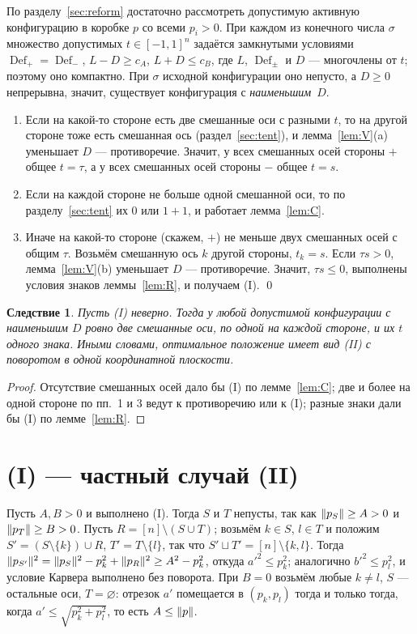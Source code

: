 \documentclass[11pt]{article}
\newtheorem{corollary}[theorem]{Следствие}
\theoremstyle{definition}
\theoremstyle{remark}
\newcommand{\Def}{\operatorname{Def}}
\DeclarePairedDelimiter{\norm}{\lVert}{\rVert}
\begin{document}
По разделу~\ref{sec:reform} достаточно рассмотреть допустимую активную конфигурацию в коробке $p$ со всеми
$p_i>0$. При каждом из конечного числа $\sigma$ множество допустимых $t\in[-1,1]^n$ задаётся замкнутыми условиями
$\Def_+=\Def_-$, $L-D\ge c_A$, $L+D\le c_B$, где $L$, $\Def_\pm$ и $D$ --- многочлены от $t$; поэтому оно
компактно. При $\sigma$ исходной конфигурации оно непусто, а $D\ge0$ непрерывна, значит, существует конфигурация с \emph{наименьшим}~$D$.
\begin{enumerate}
\item Если на какой-то стороне есть две смешанные оси с разными $t$, то на другой стороне тоже есть смешанная
ось (раздел~\ref{sec:tent}), и лемма~\ref{lem:V}(a) уменьшает $D$ --- противоречие. Значит, у всех смешанных осей
стороны $+$ общее $t=\tau$, а у всех смешанных осей стороны $-$ общее $t=s$.
\item Если на каждой стороне не больше одной смешанной оси, то по разделу~\ref{sec:tent} их $0$ или $1+1$, и
работает лемма~\ref{lem:C}.
\item Иначе на какой-то стороне (скажем, $+$) не меньше двух смешанных осей с общим $\tau$. Возьмём смешанную ось
$k$ другой стороны, $t_k=s$. Если $\tau s>0$, лемма~\ref{lem:V}(b) уменьшает $D$ --- противоречие. Значит,
$\tau s\le0$, выполнены условия знаков леммы~\ref{lem:R}, и получаем (I). \qed
\end{enumerate}

\begin{corollary}\label{cor:structure}
Пусть (I) неверно. Тогда у любой допустимой конфигурации с наименьшим $D$ ровно две смешанные оси, по одной на
каждой стороне, и их $t$ одного знака. Иными словами, оптимальное положение имеет вид (II) с поворотом в одной
координатной плоскости.
\end{corollary}
\begin{proof}
Отсутствие смешанных осей дало бы (I) по лемме~\ref{lem:C}; две и более на одной стороне по пп.~1 и 3 ведут к
противоречию или к (I); разные знаки дали бы (I) по лемме~\ref{lem:R}.
\end{proof}

\section{(I) --- частный случай (II)}\label{sec:I}

Пусть $A,B>0$ и выполнено (I). Тогда $S$ и $T$ непусты, так как $\norm{p_S}\ge A>0$ и $\norm{p_T}\ge B>0$.
Пусть $R=[n]\setminus(S\cup T)$; возьмём $k\in S$, $l\in T$ и положим $S'=(S\setminus\{k\})\cup R$,
$T'=T\setminus\{l\}$, так что $S'\sqcup T'=[n]\setminus\{k,l\}$. Тогда
$\norm{p_{S'}}^2=\norm{p_S}^2-p_k^2+\norm{p_R}^2\ge A^2-p_k^2$, откуда $a'^2\le p_k^2$; аналогично
$b'^2\le p_l^2$, и условие Карвера выполнено без поворота. При $B=0$ возьмём любые $k\ne l$, $S$ --- остальные
оси, $T=\varnothing$: отрезок $a'$ помещается в $(p_k,p_l)$ тогда и только тогда, когда
$a'\le\sqrt{p_k^2+p_l^2}$, то есть $A\le\norm p$.
\end{document}
